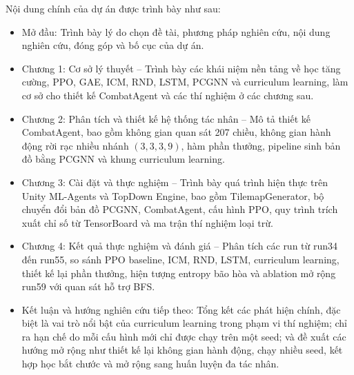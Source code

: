 \vspace{0.5cm}

Nội dung chính của dự án được trình bày như sau:

\renewcommand{\labelitemi}{$-$}
\begin{itemize}
	\item Mở đầu: Trình bày lý do chọn đề tài, phương pháp nghiên cứu, nội dung nghiên cứu, đóng góp và bố cục của dự án.
	\item Chương 1: Cơ sở lý thuyết -- Trình bày các khái niệm nền tảng về học tăng cường, PPO, GAE, ICM, RND, LSTM, PCGNN và curriculum learning, làm cơ sở cho thiết kế CombatAgent và các thí nghiệm ở các chương sau.
	\item Chương 2: Phân tích và thiết kế hệ thống tác nhân -- Mô tả thiết kế CombatAgent, bao gồm không gian quan sát 207 chiều, không gian hành động rời rạc nhiều nhánh $(3,3,3,9)$, hàm phần thưởng, pipeline sinh bản đồ bằng PCGNN và khung curriculum learning.
	\item Chương 3: Cài đặt và thực nghiệm -- Trình bày quá trình hiện thực trên Unity ML-Agents và TopDown Engine, bao gồm TilemapGenerator, bộ chuyển đổi bản đồ PCGNN, CombatAgent, cấu hình PPO, quy trình trích xuất chỉ số từ TensorBoard và ma trận thí nghiệm loại trừ.
    \item Chương 4: Kết quả thực nghiệm và đánh giá -- Phân tích các run từ run34 đến run55, so sánh PPO baseline, ICM, RND, LSTM, curriculum learning, thiết kế lại phần thưởng, hiện tượng entropy bão hòa và ablation mở rộng run59 với quan sát hỗ trợ BFS.
	\item Kết luận và hướng nghiên cứu tiếp theo: Tổng kết các phát hiện chính, đặc biệt là vai trò nổi bật của curriculum learning trong phạm vi thí nghiệm; chỉ ra hạn chế do mỗi cấu hình mới chỉ được chạy trên một seed; và đề xuất các hướng mở rộng như thiết kế lại không gian hành động, chạy nhiều seed, kết hợp học bắt chước và mở rộng sang huấn luyện đa tác nhân.
\end{itemize}
